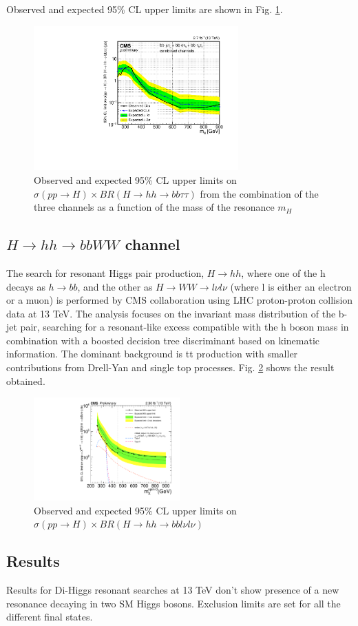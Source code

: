 Observed and expected 95\% CL upper limits are shown in Fig. \ref{fig:HH_bbtt}.


\begin{figure}[htb]
\centering
	\includegraphics[width=0.7\textwidth, angle=0] {figures/H_hh_bbtautau_CMS_BR.pdf}
\caption{Observed and expected 95\% CL upper limits on $\sigma(pp\rightarrow H) \times BR(H \rightarrow hh \rightarrow bb\tau\tau)$
from the combination of the three channels as a function of the mass of the resonance $m_H$}
\label{fig:HH_bbtt}   
\end{figure}

\subsection{$H\rightarrow hh \rightarrow bbWW$ channel}
The search for resonant Higgs pair production, $H \rightarrow hh$, where one of the h decays as $h\rightarrow bb$, and the other as $H \rightarrow WW \rightarrow l\nu l\nu$ (where l is either an electron or a muon) is performed by CMS collaboration using LHC proton-proton collision data at 13 TeV. The analysis focuses on the invariant mass distribution of the b-jet pair, searching for a resonant-like excess compatible with the h boson mass in combination with a boosted decision tree discriminant based on kinematic information. The dominant background is tt production with smaller contributions
from Drell-Yan and single top processes. Fig. \ref{fig:HH_bbWW} shows the result obtained.

\begin{figure}[htb]
\centering
	\includegraphics[width=0.5\textwidth, angle=0] {figures/H_hh_bbWW_CMS_BR.pdf}
\caption{Observed and expected 95\% CL upper limits on $\sigma(pp\rightarrow H) \times BR(H \rightarrow hh \rightarrow bbl\nu l\nu)$}
\label{fig:HH_bbWW}   
\end{figure}

 
\subsection{Results}
Results for Di-Higgs resonant searches at 13 TeV don't show presence of a new resonance decaying in two SM Higgs bosons. Exclusion limits are set for all the different final states.





